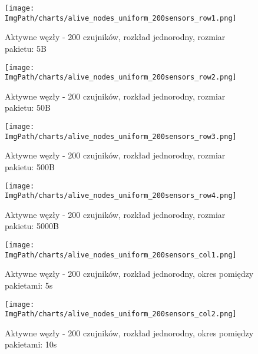 \begin{figure}[!htbp]
	\begin{center}
		\texttt{[image: \\ImgPath/charts/alive\_nodes\_uniform\_200sensors\_row1.png]}
	\end{center}
	\caption{Aktywne węzły - 200 czujników, rozkład jednorodny, rozmiar pakietu: 5B}
\end{figure}

\begin{figure}[!htbp]
	\begin{center}
		\texttt{[image: \\ImgPath/charts/alive\_nodes\_uniform\_200sensors\_row2.png]}
	\end{center}
	\caption{Aktywne węzły - 200 czujników, rozkład jednorodny, rozmiar pakietu: 50B}
\end{figure}

\begin{figure}[!htbp]
	\begin{center}
		\texttt{[image: \\ImgPath/charts/alive\_nodes\_uniform\_200sensors\_row3.png]}
	\end{center}
	\caption{Aktywne węzły - 200 czujników, rozkład jednorodny, rozmiar pakietu: 500B}
\end{figure}

\begin{figure}[!htbp]
	\begin{center}
		\texttt{[image: \\ImgPath/charts/alive\_nodes\_uniform\_200sensors\_row4.png]}
	\end{center}
	\caption{Aktywne węzły - 200 czujników, rozkład jednorodny, rozmiar pakietu: 5000B}
\end{figure}

\begin{figure}[!htbp]
	\begin{center}
		\texttt{[image: \\ImgPath/charts/alive\_nodes\_uniform\_200sensors\_col1.png]}
	\end{center}
	\caption{Aktywne węzły - 200 czujników, rozkład jednorodny, okres pomiędzy pakietami: 5s}
\end{figure}

\begin{figure}[!htbp]
	\begin{center}
		\texttt{[image: \\ImgPath/charts/alive\_nodes\_uniform\_200sensors\_col2.png]}
	\end{center}
	\caption{Aktywne węzły - 200 czujników, rozkład jednorodny, okres pomiędzy pakietami: 10s}
\end{figure}

